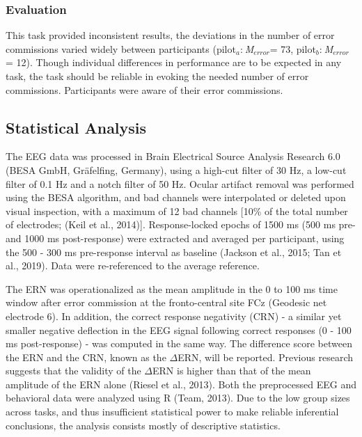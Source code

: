 \documentclass[twocolumn, serif, authordate, review]{jote-article}
\begin{document}
\subsubsection*{Evaluation}This task provided inconsistent results, the deviations in the number of error commissions varied widely between participants (pilot${}_{a}$:${}_{\ }$\textit{M${}_{error}$}= 73, pilot${}_{b}$:${}_{\ }$\textit{M${}_{error}$}${}_{\ }$= 12). Though individual differences in performance are to be expected in any task, the task should be reliable in evoking the needed number of error commissions. Participants were aware of their error commissions.~

{}
\subsection*{Statistical Analysis} 
\gotoreview
\label{sec:statistical}

\noindent The EEG data was processed in Brain Electrical Source Analysis Research 6.0 (BESA GmbH, Gr\"{a}felfing, Germany), using a high-cut filter of 30 Hz, a low-cut filter of 0.1 Hz and a notch filter of 50 Hz. Ocular artifact removal was performed using the BESA algorithm, and bad channels were interpolated or deleted upon visual inspection, with a maximum of 12 bad channels [10\% of the total number of electrodes; (Keil et al., 2014)]. Response-locked epochs of 1500 ms (500 ms pre- and 1000 ms post-response) were extracted and averaged per participant, using the 500 - 300 ms pre-response interval as baseline (Jackson et al., 2015; Tan et al., 2019). Data were re-referenced to the average reference.

The ERN was operationalized as the mean amplitude in the 0 to 100 ms time window after error commission at the fronto-central site FCz (Geodesic net electrode 6). In addition, the correct response negativity (CRN) - a similar yet smaller negative deflection in the EEG signal following correct responses (0 - 100 ms post-response) - was computed in the same way. The difference score between the ERN and the CRN, known as the $\Delta$ERN, will be reported. Previous research suggests that the validity of the $\Delta$ERN is higher than that of the mean amplitude of the ERN alone (Riesel et al., 2013). Both the preprocessed EEG and behavioral data were analyzed using R (Team, 2013). Due to the low group sizes across tasks, and thus insufficient statistical power to make reliable inferential conclusions, the analysis consists mostly of descriptive statistics.
\end{document}
